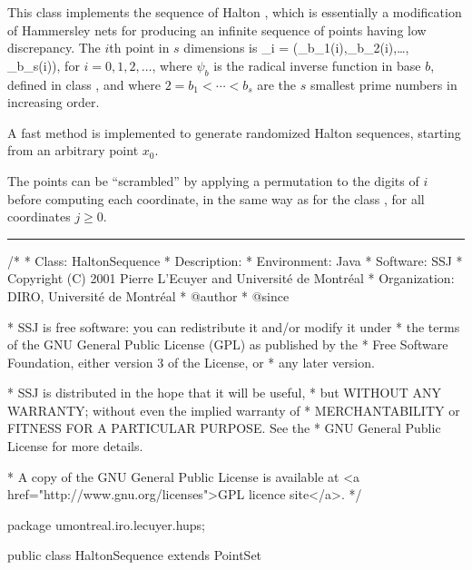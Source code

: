 
This class implements the sequence of Halton \cite{rHAL60a},
which is essentially a modification of Hammersley nets for producing 
an infinite sequence of points having low discrepancy.
The $i$th point in $s$ dimensions is 
\eq
 \bu_i = (\psi_{b_1}(i),\psi_{b_2}(i),\dots, \psi_{b_s}(i)),
\endeq
for $i=0,1,2,\dots$, where $\psi_b$ is the radical inverse function
in base $b$, defined in class , and where
$2 = b_1 < \cdots < b_s$ are the $s$ smallest prime numbers in 
increasing order.

A fast method is implemented to generate randomized Halton sequences, starting from an arbitrary point $x_0$.

The points can be ``scrambled'' by applying a permutation to the 
digits of $i$ before computing each coordinate, in the same way as for the class
, for all coordinates $j\ge 0$.

\bigskip\hrule\bigskip

\begin{code}

\begin{hide}
/*
 * Class:        HaltonSequence
 * Description:  
 * Environment:  Java
 * Software:     SSJ 
 * Copyright (C) 2001  Pierre L'Ecuyer and Université de Montréal
 * Organization: DIRO, Université de Montréal
 * @author       
 * @since

 * SSJ is free software: you can redistribute it and/or modify it under
 * the terms of the GNU General Public License (GPL) as published by the
 * Free Software Foundation, either version 3 of the License, or
 * any later version.

 * SSJ is distributed in the hope that it will be useful,
 * but WITHOUT ANY WARRANTY; without even the implied warranty of
 * MERCHANTABILITY or FITNESS FOR A PARTICULAR PURPOSE.  See the
 * GNU General Public License for more details.

 * A copy of the GNU General Public License is available at
   <a href="http://www.gnu.org/licenses">GPL licence site</a>.
 */
\end{hide}
package umontreal.iro.lecuyer.hups;


public class HaltonSequence extends PointSet\begin{hide} { 
   private int[] base;           // Vector of prime bases.
   private int[][] permutation;  // Digits permutation, for each dimension.
   private boolean permuted;     // Permute digits?
   private RadicalInverse[] radinv; // Vector of RadicalInverse's.
   private int[] start;          // starting indices
   private final static int positiveBitMask = ~Integer.reverse(1);
\end{hide}
\end{code}

